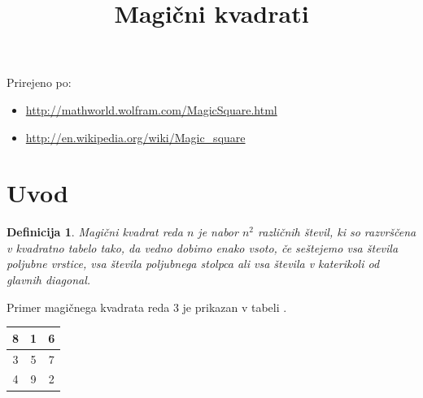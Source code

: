 \documentclass[a4paper,12pt]{article}
\title{Magični kvadrati}
\date{}
\author{}
\newtheorem{definicija}{Definicija}
\begin{document}
\maketitle

Prirejeno po:

\begin{itemize}
   \item\url{http://mathworld.wolfram.com/MagicSquare.html}
   \item\url{http://en.wikipedia.org/wiki/Magic_square}
\end{itemize}

\tableofcontents

\newpage

\section{Uvod}


\begin{definicija}
   \emph{Magični kvadrat} reda \(n\) je nabor \(n^2\) različnih števil,
   ki so razvrščena v kvadratno tabelo tako, da vedno dobimo enako vsoto,
   če seštejemo vsa števila poljubne vrstice, vsa števila poljubnega
   stolpca ali vsa števila v katerikoli od glavnih diagonal.
\end{definicija}


Primer magičnega kvadrata reda 3 je prikazan v tabeli \pageref. %
\begin{table}[!ht]
   \large\begin{tabular}{|c|c|c|}\toprule 
   \label{table:mag3}
 8 & 1 & 6 \\\hline
 3 & 5 & 7 \\\hline
 4 & 9 & 2 \\\hline
   \end{tabular}\normalsize
\end{table}
\end{document}
